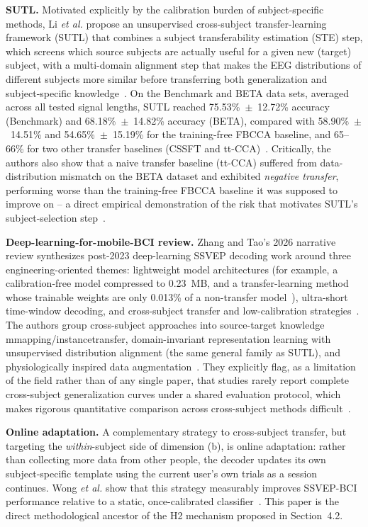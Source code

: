 \documentclass[11pt]{article}
\begin{document}
\textbf{SUTL.} Motivated explicitly by the calibration burden of subject-specific methods, Li \textit{et al.} propose an unsupervised cross-subject transfer-learning framework (SUTL) that combines a subject transferability estimation (STE) step, which screens which source subjects are actually useful for a given new (target) subject, with a multi-domain alignment step that makes the EEG distributions of different subjects more similar before transferring both generalization and subject-specific knowledge~\cite{li2024sutl}. On the Benchmark and BETA data sets, averaged across all tested signal lengths, SUTL reached 75.53\%~$\pm$~12.72\% accuracy (Benchmark) and 68.18\%~$\pm$~14.82\% accuracy (BETA), compared with 58.90\%~$\pm$~14.51\% and 54.65\%~$\pm$~15.19\% for the training-free FBCCA baseline, and 65--66\% for two other transfer baselines (CSSFT and tt-CCA)~\cite{li2024sutl}. Critically, the authors also show that a naive transfer baseline (tt-CCA) suffered from data-distribution mismatch on the BETA dataset and exhibited \emph{negative transfer}, performing worse than the training-free FBCCA baseline it was supposed to improve on -- a direct empirical demonstration of the risk that motivates SUTL's subject-selection step~\cite{li2024sutl}.

\textbf{Deep-learning-for-mobile-BCI review.} Zhang and Tao's 2026 narrative review synthesizes post-2023 deep-learning SSVEP decoding work around three engineering-oriented themes: lightweight model architectures (for example, a calibration-free model compressed to 0.23~MB, and a transfer-learning method whose trainable weights are only 0.013\% of a non-transfer model~\cite{zhang2026mobilereview}), ultra-short time-window decoding, and cross-subject transfer and low-calibration strategies~\cite{zhang2026mobilereview}. The authors group cross-subject approaches into source-target knowledge mmapping/instancetransfer, domain-invariant representation learning with unsupervised distribution alignment (the same general family as SUTL), and physiologically inspired data augmentation~\cite{zhang2026mobilereview}. They explicitly flag, as a limitation of the field rather than of any single paper, that studies rarely report complete cross-subject generalization curves under a shared evaluation protocol, which makes rigorous quantitative comparison across cross-subject methods difficult~\cite{zhang2026mobilereview}.

\textbf{Online adaptation.} A complementary strategy to cross-subject transfer, but targeting the \emph{within}-subject side of dimension (b), is online adaptation: rather than collecting more data from other people, the decoder updates its own subject-specific template using the current user's own trials as a session continues. Wong \textit{et al.} show that this strategy measurably improves SSVEP-BCI performance relative to a static, once-calibrated classifier~\cite{wong2022onlineadaptation}. This paper is the direct methodological ancestor of the H2 mechanism proposed in Section~4.2.
\end{document}
